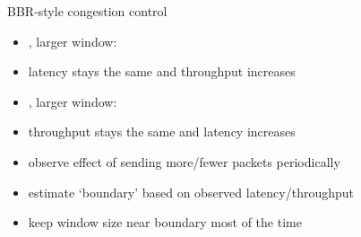 \begin{frame}{BBR-style congestion control}
    \begin{itemize}
    \item {}, larger window:
    \item latency stays the same and throughput increases
    \vspace{.5cm}
    \item {}, larger window:
    \item throughput stays the same and latency increases
    \vspace{.5cm}
    \item<4-> observe effect of sending more/fewer packets periodically
    \item<4-> estimate `boundary' based on observed latency/throughput
    \item<4-> keep window size near boundary most of the time
    \end{itemize}
\end{frame}

